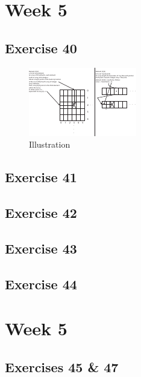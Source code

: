 \documentclass[a4paper]{article}
\let\stdsection\section
\renewcommand\section{\newpage\stdsection}
\begin{document}
\section*{Week 5}

\subsection*{Exercise 40}

\begin{figure}[H]
\centerline{\includegraphics[trim={0 0cm 0 0cm}, scale=5]{../40/illustration.pdf}}
\caption{Illustration}
\end{figure}

\newpage
\subsection*{Exercise 41}


\newpage
\subsection*{Exercise 42}

\newpage
\subsection*{Exercise 43}


\newpage
\subsection*{Exercise 44}


\section*{Week 5}
\subsection*{Exercises 45 \& 47}
\end{document}
